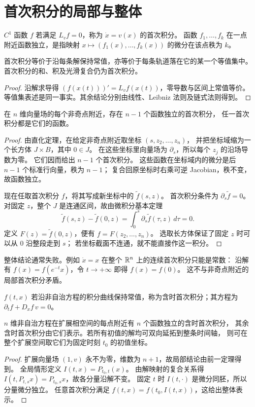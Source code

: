 \section{首次积分的局部与整体}
\begin{definition}
$C^1$ 函数 $f$ 若满足 $L_vf=0$，称为 $\dot x=v(x)$ 的首次积分。
函数 $f_1,\ldots,f_k$ 在一点附近函数独立，是指映射
$x\mapsto(f_1(x),\ldots,f_k(x))$ 的微分在该点秩为 $k$。
\end{definition}
\begin{proposition}
首次积分等价于沿每条解保持常值，亦等价于每条轨道落在它的某一个等值集中。
首次积分的和、积及光滑复合仍为首次积分。
\end{proposition}
\begin{proof}
沿解求导得 $(f(x(t)))'=L_vf(x(t))$，零导数与区间上常值等价。
等值集表述是同一事实。其余结论分别由线性、Leibniz 法则及链式法则得到。
\end{proof}
\begin{theorem}[局部首次积分]
在 $n$ 维向量场的每个非奇点附近，存在 $n-1$ 个函数独立的首次积分，
任一首次积分都是它们的函数。
\end{theorem}
\begin{proof}
由直化定理，在给定非奇点附近取坐标 $(s,z_2,\ldots,z_n)$，
并把坐标域缩为一个长方体 $J\times B$，其中 $0\in J$。
在这些坐标里向量场为 $\partial_s$，所以每个 $z_j$ 的沿场导数为零。
它们因而给出 $n-1$ 个首次积分。
这些函数在坐标域内的微分是后 $n-1$ 个标准行向量，秩为 $n-1$；
复合回原坐标时右乘可逆 Jacobian，秩不变，故函数独立。

现在任取首次积分 $f$，将其写成新坐标中的 $\widetilde f(s,z)$。
首次积分条件为 $\partial_s\widetilde f=0$。
对固定 $z$，整个 $J$ 是连通区间，故由微积分基本定理
\[
 \widetilde f(s,z)-\widetilde f(0,z)
 =\int_0^s\partial_s\widetilde f(\tau,z)\,d\tau=0.
\]
定义 $F(z)=\widetilde f(0,z)$，便有 $f=F(z_2,\ldots,z_n)$。
选取长方体保证了固定 $z$ 时可以从 $0$ 沿整段走到 $s$；
若坐标截面不连通，就不能直接作这一积分。
\end{proof}
整体结论通常失败。例如 $\dot x=x$ 在整个 $\mathbb{R}^n$ 上的连续首次积分只能是常数：
沿解有 $f(x)=f(e^{-t}x)$，令 $t\to+\infty$ 即得 $f(x)=f(0)$。
这不与非奇点附近的局部首次积分矛盾。

\begin{definition}
$f(t,x)$ 若沿非自治方程的积分曲线保持常值，称为含时首次积分；其方程为
$\partial_tf+D_xf\,v=0$。
\end{definition}
\begin{theorem}
$n$ 维非自治方程在扩展相空间的每点附近有 $n$ 个函数独立的含时首次积分，
其余含时首次积分由它们表示。若所有初值的解均可双向延拓到整条时间轴，
则可在整个扩展空间取它们为固定时刻 $t_0$ 的初值坐标。
\end{theorem}
\begin{proof}
扩展向量场 $(1,v)$ 永不为零，维数为 $n+1$，故局部结论由前一定理得到。
全局情形定义 $I(t,x)=P_{t_0,t}(x)$。
由解映射的复合关系得
$I(t,P_{t,s}x)=P_{t_0,s}x$，故各分量沿解不变。
固定 $t$ 时 $I(t,\cdot)$ 是微分同胚，所以分量微分独立。
任意首次积分满足
$f(t,x)=f(t_0,I(t,x))$，这给出整体表示。
\end{proof}

